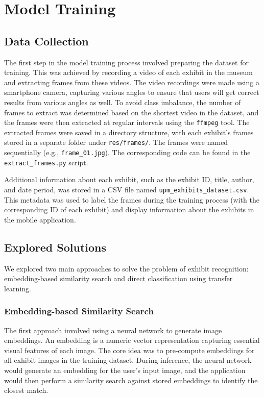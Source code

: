 \chapter{Model Training}\label{chapter:model_training}

\section{Data Collection}

The first step in the model training process involved preparing the dataset for training. This was achieved by recording a video of each exhibit in the museum and extracting frames from these videos. The video recordings were made using a smartphone camera, capturing various angles to ensure that users will get correct results from various angles as well. To avoid class imbalance, the number of frames to extract was determined based on the shortest video in the dataset, and the frames were then extracted at regular intervals using the \texttt{ffmpeg} tool. The extracted frames were saved in a directory structure, with each exhibit's frames stored in a separate folder under \texttt{res/frames/}. The frames were named sequentially (e.g., \texttt{frame\_01.jpg}). The corresponding code can be found in the \texttt{extract\_frames.py} script.

Additional information about each exhibit, such as the exhibit ID, title, author, and date period, was stored in a CSV file named \texttt{upm\_exhibits\_dataset.csv}. This metadata was used to label the frames during the training process (with the corresponding ID of each exhibit) and display information about the exhibits in the mobile application.

\section{Explored Solutions}

We explored two main approaches to solve the problem of exhibit recognition: embedding-based similarity search and direct classification using transfer learning.

\subsection{Embedding-based Similarity Search}

The first approach involved using a neural network to generate image embeddings. An embedding is a numeric vector representation capturing essential visual features of each image. The core idea was to pre-compute embeddings for all exhibit images in the training dataset. During inference, the neural network would generate an embedding for the user's input image, and the application would then perform a similarity search against stored embeddings to identify the closest match.

